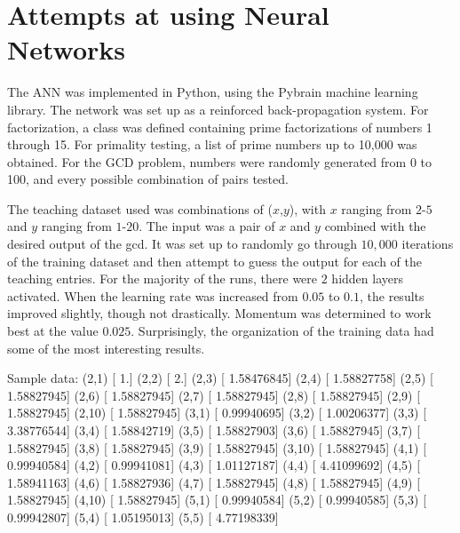\documentclass{beamer}
\begin{document}
\section{Attempts at using Neural Networks}
\begin{frame}
The ANN was implemented in Python, using the Pybrain machine learning library.
The network was set up as a reinforced back-propagation system.
For factorization, a class was defined containing prime factorizations of numbers 1 through 15.
For primality testing, a list of prime numbers up to 10,000 was obtained.
For the GCD problem, numbers were randomly generated from 0 to 100, and every possible combination of pairs tested.
\end{frame}

\begin{frame}
The teaching dataset used was combinations of ($x$,$y$), with $x$ ranging from $2$-$5$ and $y$ ranging from $1$-$20$.  
The input was a pair of $x$ and $y$ combined with the desired output of the gcd.  It was set up to randomly go through $10,000$ iterations of the training dataset and then attempt to guess the output for each of the teaching entries.
For the majority of the runs, there were $2$ hidden layers activated.
When the learning rate was increased from $0.05$ to $0.1$, the results improved slightly, though not drastically.
Momentum was determined to work best at the value $0.025$.
Surprisingly, the organization of the training data had some of the most interesting results.
\end{frame}

\begin{frame}
Sample data:
(2,1) [ 1.]
(2,2) [ 2.]
(2,3) [ 1.58476845]
\newline (2,4) [ 1.58827758]
(2,5) [ 1.58827945]
(2,6) [ 1.58827945]
\newline (2,7)  [ 1.58827945]
(2,8) [ 1.58827945]
(2,9) [ 1.58827945]
\newline (2,10)  [ 1.58827945]
(3,1) [ 0.99940695]
(3,2) [ 1.00206377]
\newline (3,3) [ 3.38776544]
(3,4) [ 1.58842719]
(3,5) [ 1.58827903]
\newline (3,6) [ 1.58827945]
(3,7) [ 1.58827945]
(3,8) [ 1.58827945]
\newline (3,9) [ 1.58827945]
(3,10) [ 1.58827945]
(4,1) [ 0.99940584]
\newline (4,2) [ 0.99941081]
(4,3) [ 1.01127187]
(4,4) [ 4.41099692]
\newline (4,5) [ 1.58941163]
(4,6) [ 1.58827936]
(4,7) [ 1.58827945]
\newline (4,8) [ 1.58827945]
(4,9) [ 1.58827945]
(4,10) [ 1.58827945]
\newline (5,1) [ 0.99940584]
(5,2) [ 0.99940585]
(5,3) [ 0.99942807]
\newline (5,4) [ 1.05195013]
(5,5) [ 4.77198339]
\end{frame}
\end{document}
